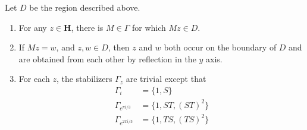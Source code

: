 \begin{theorem}
    Let $D$ be the region described above.
    \begin{enumerate}
        \item For any $z \in \mathbf{H}$, there is $M \in \Gamma$ for which $Mz \in D$.
        \item If $Mz = w$, and $z,w \in D$, then $z$ and $w$ both occur on the boundary of $D$ and are obtained from each other by reflection in the $y$ axis.
        \item For each $z$, the stabilizers $\Gamma_z$ are trivial except that
        \begin{align*}
            \Gamma_i &= \{ 1, S \}\\
            \Gamma_{e^{\pi i/3}} &= \{ 1, ST, (ST)^2 \}\\
            \Gamma_{e^{2 \pi i/3}} &= \{ 1, TS, (TS)^2 \}
        \end{align*}
    \end{enumerate}
\end{theorem}
